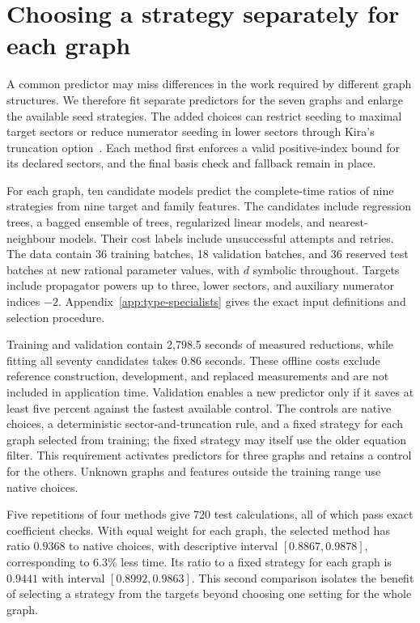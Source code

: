 \providecommand{\StudySection}{\section}
\providecommand{\StudySubsection}{\subsection}

\StudySection{Choosing a strategy separately for each graph}
\label{sec:type-specialists}
A common predictor may miss differences in the work required by different graph structures. We therefore fit separate predictors for the seven graphs and enlarge the available seed strategies. The added choices can restrict seeding to maximal target sectors or reduce numerator seeding in lower sectors through Kira's truncation option~\cite{Kira3}. Each method first enforces a valid positive-index bound for its declared sectors, and the final basis check and fallback remain in place.

For each graph, ten candidate models predict the complete-time ratios of nine strategies from nine target and family features. The candidates include regression trees, a bagged ensemble of trees, regularized linear models, and nearest-neighbour models. Their cost labels include unsuccessful attempts and retries. The data contain 36 training batches, 18 validation batches, and 36 reserved test batches at new rational parameter values, with $d$ symbolic throughout. Targets include propagator powers up to three, lower sectors, and auxiliary numerator indices $-2$. Appendix~\ref{app:type-specialists} gives the exact input definitions and selection procedure.

Training and validation contain 2,798.5 seconds of measured reductions, while fitting all seventy candidates takes 0.86 seconds. These offline costs exclude reference construction, development, and replaced measurements and are not included in application time. Validation enables a new predictor only if it saves at least five percent against the fastest available control. The controls are native choices, a deterministic sector-and-truncation rule, and a fixed strategy for each graph selected from training; the fixed strategy may itself use the older equation filter. This requirement activates predictors for three graphs and retains a control for the others. Unknown graphs and features outside the training range use native choices.

Five repetitions of four methods give 720 test calculations, all of which pass exact coefficient checks. With equal weight for each graph, the selected method has ratio $0.9368$ to native choices, with descriptive interval $[0.8867,0.9878]$, corresponding to 6.3\% less time. Its ratio to a fixed strategy for each graph is $0.9441$ with interval $[0.8992,0.9863]$. This second comparison isolates the benefit of selecting a strategy from the targets beyond choosing one setting for the whole graph.

